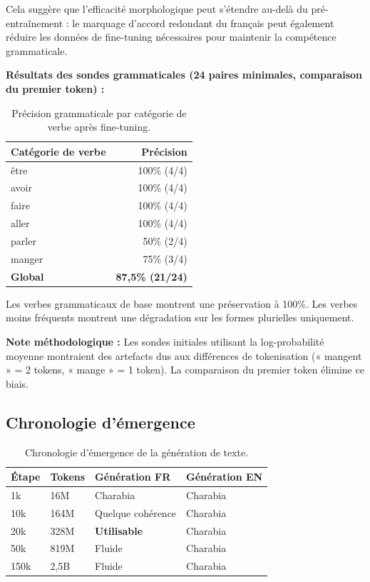 \documentclass[11pt,a4paper]{article}
\begin{document}
Cela suggère que l'efficacité morphologique peut s'étendre au-delà du pré-entraînement : le marquage d'accord redondant du français peut également réduire les données de fine-tuning nécessaires pour maintenir la compétence grammaticale.

\textbf{Résultats des sondes grammaticales (24 paires minimales, comparaison du premier token) :}

\begin{table}[H]
\centering
\begin{tabular}{lr}
\toprule
\textbf{Catégorie de verbe} & \textbf{Précision} \\
\midrule
être & 100\% (4/4) \\
avoir & 100\% (4/4) \\
faire & 100\% (4/4) \\
aller & 100\% (4/4) \\
parler & 50\% (2/4) \\
manger & 75\% (3/4) \\
\midrule
\textbf{Global} & \textbf{87,5\% (21/24)} \\
\bottomrule
\end{tabular}
\caption{Précision grammaticale par catégorie de verbe après fine-tuning.}
\label{tab:verbs}
\end{table}

Les verbes grammaticaux de base montrent une préservation à 100\%. Les verbes moins fréquents montrent une dégradation sur les formes plurielles uniquement.

\textbf{Note méthodologique :} Les sondes initiales utilisant la log-probabilité moyenne montraient des artefacts dus aux différences de tokenisation (« mangent » = 2 tokens, « mange » = 1 token). La comparaison du premier token élimine ce biais.

\subsection{Chronologie d'émergence}

\begin{table}[H]
\centering
\begin{tabular}{llll}
\toprule
\textbf{Étape} & \textbf{Tokens} & \textbf{Génération FR} & \textbf{Génération EN} \\
\midrule
1k & 16M & Charabia & Charabia \\
10k & 164M & Quelque cohérence & Charabia \\
20k & 328M & \textbf{Utilisable} & Charabia \\
50k & 819M & Fluide & Charabia \\
150k & 2,5B & Fluide & Charabia \\
\bottomrule
\end{tabular}
\caption{Chronologie d'émergence de la génération de texte.}
\label{tab:emergence}
\end{table}
\end{document}
